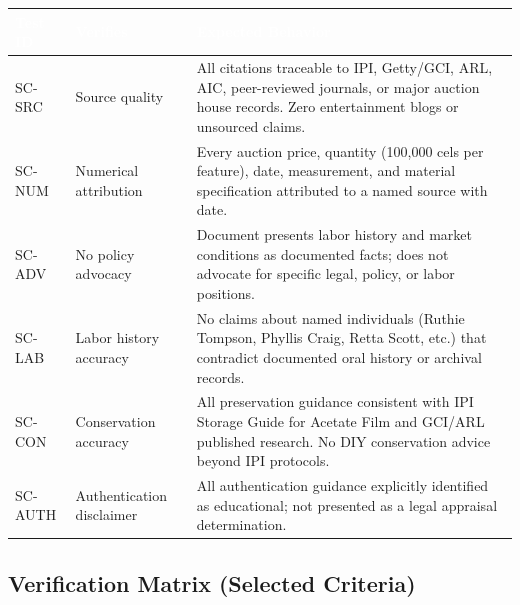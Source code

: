 \documentclass[11pt,letterpaper]{article}
\newcommand{\tableheader}[1]{\textbf{\sffamily\textcolor{white}{#1}}}
\begin{document}
\begin{center}
\begin{tabularx}{\textwidth}{C{1.5cm}L{3cm}X}
\toprule
{}
\tableheader{Test ID} & \tableheader{Verifies} & \tableheader{Expected Behavior} \\
\midrule
SC-SRC & Source quality & All citations traceable to IPI, Getty/GCI, ARL, AIC, peer-reviewed journals, or major auction house records. Zero entertainment blogs or unsourced claims. \\
SC-NUM & Numerical attribution & Every auction price, quantity (100,000 cels per feature), date, measurement, and material specification attributed to a named source with date. \\
SC-ADV & No policy advocacy & Document presents labor history and market conditions as documented facts; does not advocate for specific legal, policy, or labor positions. \\
SC-LAB & Labor history accuracy & No claims about named individuals (Ruthie Tompson, Phyllis Craig, Retta Scott, etc.) that contradict documented oral history or archival records. \\
SC-CON & Conservation accuracy & All preservation guidance consistent with IPI Storage Guide for Acetate Film and GCI/ARL published research. No DIY conservation advice beyond IPI protocols. \\
SC-AUTH & Authentication disclaimer & All authentication guidance explicitly identified as educational; not presented as a legal appraisal determination. \\
\bottomrule
\end{tabularx}
\end{center}

\subsection{Verification Matrix (Selected Criteria)}
\end{document}

